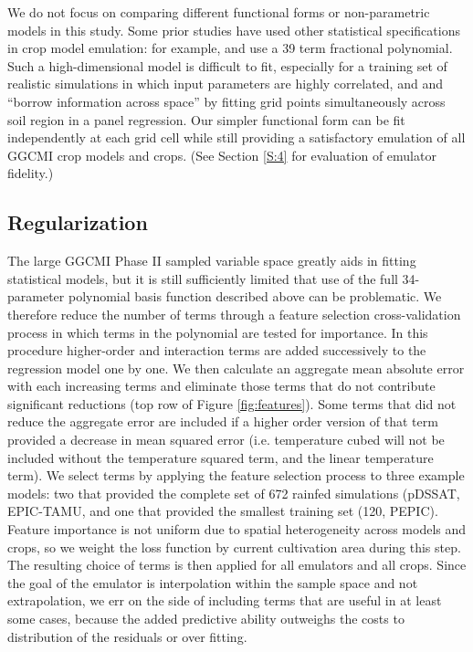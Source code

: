 \documentclass[gmd, manuscript]{copernicus} %
\begin{document}
We do not focus on comparing different functional forms or non-parametric models in this study.
Some prior studies have used other statistical specifications in crop model emulation: for example, \citet{BLANC2015} and \citet{BLANC2017} use a 39 term fractional polynomial. 
Such a high-dimensional model is difficult to fit, especially for a training set of realistic simulations in which input parameters are highly correlated, and  \citet{BLANC2015} and \citet{BLANC2017}  ``borrow information across space'' by fitting grid points simultaneously across soil region in a panel regression. 
Our simpler functional form can be fit independently at each grid cell while still providing a satisfactory emulation of all GGCMI crop models and crops. 
(See Section \ref{S:4} for evaluation of emulator fidelity.)

\subsection{Regularization}
The large GGCMI Phase II sampled variable space greatly aids in fitting statistical models, but it is still sufficiently limited that use of the full 34-parameter polynomial basis function described above can be problematic.
We therefore reduce the number of terms through a feature selection cross-validation process in which terms in the polynomial are tested for importance.
In this procedure higher-order and interaction terms are added successively to the regression model one by one. 
We then calculate an aggregate mean absolute error with each increasing terms and eliminate those terms that do not contribute significant reductions (top row of Figure \ref{fig:features}). 
Some terms that did not reduce the aggregate error are included if a higher order version of that term provided a decrease in mean squared error (i.e. temperature cubed will not be included without the temperature squared term, and the linear temperature term). 
We select terms by applying the feature selection process to three example models: two that provided the complete set of 672 rainfed simulations (pDSSAT, EPIC-TAMU, and one that provided the smallest training set (120, PEPIC). 
Feature importance is not uniform due to spatial heterogeneity across models and crops, so we weight the loss function by current cultivation area during this step. 
The resulting choice of terms is then applied for all emulators and all crops. 
Since the goal of the emulator is interpolation within the sample space and not extrapolation, we err on the side of including terms that are useful in at least some cases, because the added predictive ability outweighs the costs to distribution of the residuals or over fitting.  
\end{document}
